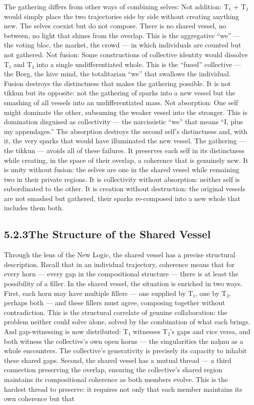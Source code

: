 The gathering differs from other ways of combining selves: Not addition: T₁ + T₂ would simply place the two trajectories side by side without creating anything new. The selves coexist but do not compose. There is no shared vessel, no between, no light that shines from the overlap. This is the aggregative “we” — the voting bloc, the market, the crowd — in which individuals are counted but not gathered. Not fusion: Some constructions of collective identity would dissolve T₁ and T₂ into a single undifferentiated whole. This is the “fused” collective — the Borg, the hive mind, the totalitarian “we” that swallows the individual. Fusion destroys the distinctness that makes the gathering possible. It is not tikkun but its opposite: not the gathering of sparks into a new vessel but the smashing of all vessels into an undifferentiated mass. Not absorption: One self might dominate the other, subsuming the weaker vessel into the stronger. This is domination disguised as collectivity — the narcissistic “we” that means “I, plus my appendages.” The absorption destroys the second self’s distinctness and, with it, the very sparks that would have illuminated the new vessel. The gathering — the tikkun — avoids all of these failures. It preserves each self in its distinctness while creating, in the space of their overlap, a coherence that is genuinely new. It is unity without fusion: the selves are one in the shared vessel while remaining two in their private regions. It is collectivity without absorption: neither self is subordinated to the other. It is creation without destruction: the original vessels are not smashed but gathered, their sparks re-composed into a new whole that includes them both.

\subsection{5.2.3\quad The Structure of the Shared Vessel}

Through the lens of the New Logic, the shared vessel has a precise structural description. Recall that in an individual trajectory, coherence means that for every horn — every gap in the compositional structure — there is at least the possibility of a filler. In the shared vessel, the situation is enriched in two ways. First, each horn may have multiple fillers — one supplied by T₁, one by T₂, perhaps both — and these fillers must agree, composing together without contradiction. This is the structural correlate of genuine collaboration: the problem neither could solve alone, solved by the combination of what each brings. And gap-witnessing is now distributed: T₁ witnesses T₂’s gaps and vice versa, and both witness the collective’s own open horns — the singularities the naḥnu as a whole encounters. The collective’s generativity is precisely its capacity to inhabit these shared gaps. Second, the shared vessel has a mutual thread — a third connection preserving the overlap, ensuring the collective’s shared region maintains its compositional coherence as both members evolve. This is the hardest thread to preserve: it requires not only that each member maintains its own coherence but that

